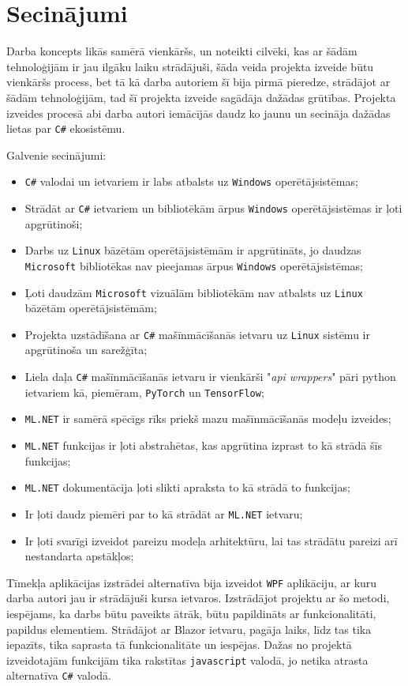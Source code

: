 \section{Secinājumi}

    Darba koncepts likās samērā vienkāršs, un noteikti cilvēki, kas ar šādām tehnoloģijām ir jau
    ilgāku laiku strādājuši, šāda veida projekta izveide būtu vienkāršs process, bet tā kā darba autoriem
    šī bija pirmā pieredze, strādājot ar šādām tehnoloģijām, tad šī projekta izveide sagādāja dažādas
    grūtības. Projekta izveides procesā abi darba autori iemācījās daudz ko jaunu  un secināja
    dažādas lietas par \texttt{C\#} ekosistēmu.

    Galvenie secinājumi:
    \begin{itemize}
        \item \texttt{C\#} valodai un ietvariem ir labs atbalsts uz \texttt{Windows} operētājsistēmas;
        \item Strādāt ar \texttt{C\#} ietvariem un bibliotēkām ārpus \texttt{Windows} operētājsistēmas ir ļoti apgrūtinoši;
        \item Darbs uz \texttt{Linux} bāzētām operētājsistēmām ir apgrūtināts, jo daudzas \texttt{Microsoft} bibliotēkas nav pieejamas ārpus \texttt{Windows} operētājsistēmas;
        \item Ļoti daudzām \texttt{Microsoft} vizuālām bibliotēkām nav atbalsts uz \texttt{Linux} bāzētām operētājsistēmām;
        \item Projekta uzstādīšana ar \texttt{C\#} mašīnmācīšanās ietvaru uz \texttt{Linux} sistēmu ir apgrūtinoša un sarežģīta;
        \item Liela daļa \texttt{C\#} mašīnmācīšanās ietvaru ir vienkārši "\textit{api wrappers}" pāri python ietvariem kā, piemēram, \texttt{PyTorch} un \texttt{TensorFlow};
        \item \texttt{ML.NET} ir samērā spēcīgs rīks priekš mazu mašīnmācīšanās modeļu izveides;
        \item \texttt{ML.NET} funkcijas ir ļoti abstrahētas, kas apgrūtina izprast to kā strādā šīs funkcijas;
        \item \texttt{ML.NET} dokumentācija ļoti slikti apraksta to kā strādā to funkcijas;
        \item Ir ļoti daudz piemēri par to kā strādāt ar \texttt{ML.NET} ietvaru;
        \item Ir ļoti svarīgi izveidot pareizu modeļa arhitektūru, lai tas strādātu pareizi arī nestandarta apstākļos;
    \end{itemize}

    \par Tīmekļa aplikācijas izstrādei alternatīva bija izveidot \texttt{WPF} aplikāciju, ar kuru darba autori jau ir strādājuši kursa ietvaros. Izstrādājot projektu ar šo metodi, iespējams, ka darbs būtu paveikts ātrāk, būtu papildināts ar funkcionalitāti, papildus elementiem. Strādājot ar Blazor ietvaru, pagāja laiks, līdz tas tika iepazīts, tika saprasta tā funkcionalitāte un iespējas. Dažas no projektā izveidotajām funkcijām tika rakstītas \texttt{javascript} valodā, jo netika atrasta alternatīva \texttt{C\#} valodā.